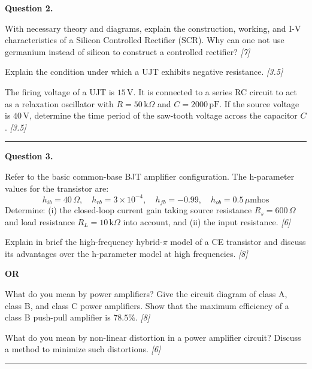 \documentclass[11pt,a4paper]{article}
\newcommand{\pts}[1]{\hfill   \textit{[#1]}}
\begin{document}
\noindent   \textbf{Question 2.}

\begin{parts}
  \item With necessary theory and diagrams, explain the construction, working, and I-V characteristics of a Silicon Controlled Rectifier (SCR). Why can one not use germanium instead of silicon to construct a controlled rectifier? \pts{7}
  \item Explain the condition under which a UJT exhibits negative resistance. \pts{3.5}
  \item The firing voltage of a UJT is $15\, \text{V}$. It is connected to a series RC circuit to act as a relaxation oscillator with $R = 50\, \text{k}\Omega$ and $C = 2000\, \text{pF}$. If the source voltage is $40\, \text{V}$, determine the time period of the saw-tooth voltage across the capacitor $C$. \pts{3.5}
\end{parts}

\medskip\rule{\linewidth}{0.2pt}




\noindent   \textbf{Question 3.}

\begin{parts}
  \item Refer to the basic common-base BJT amplifier configuration. The h-parameter values for the transistor are:
    \[ h_{ib} = 40\,\Omega, \quad h_{rb} = 3  \times 10^{-4}, \quad h_{fb} = -0.99, \quad h_{ob} = 0.5\,\mu \text{mhos} \]
    Determine: (i) the closed-loop current gain taking source resistance $R_s = 600\,\Omega$ and load resistance $R_L = 10\, \text{k}\Omega$ into account, and (ii) the input resistance. \pts{6}
  \item Explain in brief the high-frequency hybrid-$\pi$ model of a CE transistor and discuss its advantages over the h-parameter model at high frequencies. \pts{8}
\end{parts}
\hfill   \textbf{OR}

\begin{parts}
  \item What do you mean by power amplifiers? Give the circuit diagram of class A, class B, and class C power amplifiers. Show that the maximum efficiency of a class B push-pull amplifier is $78.5\%$. \pts{8}
  \item What do you mean by non-linear distortion in a power amplifier circuit? Discuss a method to minimize such distortions. \pts{6}
\end{parts}

\medskip\rule{\linewidth}{0.2pt}
\end{document}
